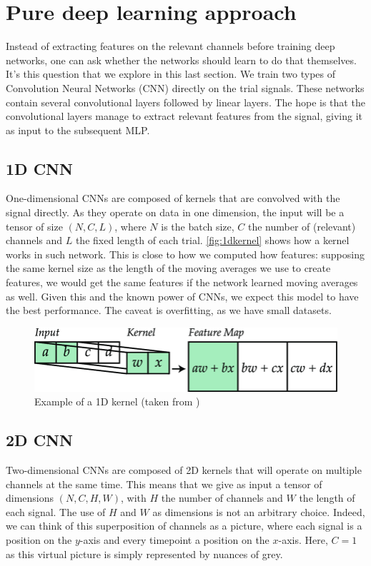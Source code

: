 \documentclass[10pt,conference,compsocconf]{IEEEtran}
\begin{document}
\section{Pure deep learning approach}
\label{sec:deeplearning}
Instead of extracting features on the relevant channels before training deep networks, one can ask whether the networks should learn to do that themselves. It's this question that we explore in this last section. We train two types of Convolution Neural Networks (CNN) directly on the trial signals. These networks contain several convolutional layers followed by linear layers. The hope is that the convolutional layers manage to extract relevant features from the signal, giving it as input to the subsequent MLP.

\subsection{1D CNN}
One-dimensional CNNs are composed of kernels that are convolved with the signal directly. As they operate on data in one dimension, the input will be a tensor of size \((N, C, L)\), where \(N\) is the batch size, \(C\) the number of (relevant) channels and \(L\) the fixed length of each trial. \autoref{fig:1dkernel} shows how a kernel works in such network. This is close to how we computed how features: supposing the same kernel size as the length of the moving averages we use to create features, we would get the same features if the network learned moving averages as well. Given this and the known power of CNNs, we expect this model to have the best performance. The caveat is overfitting, as we have small datasets.

\begin{figure}[h!]
  \center
  \includegraphics[width=\linewidth]{images/1d_kernel.png}
  \caption{Example of a 1D kernel (taken from \cite{1dkernel})}
  \label{fig:1dkernel}
\end{figure}
\FloatBarrier

\subsection{2D CNN}
Two-dimensional CNNs are composed of 2D kernels that will operate on multiple channels at the same time. This means that we give as input a tensor of dimensions \((N, C, H, W)\), with \(H\) the number of channels and \(W\) the length of each signal. The use of \(H\) and \(W\) as dimensions is not an arbitrary choice. Indeed, we can think of this superposition of channels as a picture, where each signal is a position on the \(y\)-axis and every timepoint a position on the \(x\)-axis. Here, \(C=1\) as this virtual picture is simply represented by nuances of grey.
\end{document}

